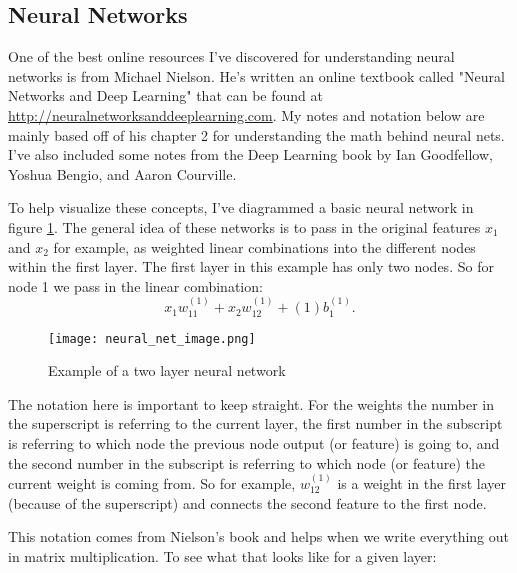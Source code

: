 \subsection{Neural Networks}

One of the best online resources I've discovered for understanding neural networks is from Michael Nielson. He's written an online textbook called "Neural Networks and Deep Learning" that can be found at \url{http://neuralnetworksanddeeplearning.com}. My notes and notation below are mainly based off of his chapter 2 for understanding the math behind neural nets. I've also included some notes from the Deep Learning book by Ian Goodfellow, Yoshua Bengio, and Aaron Courville.
 
To help visualize these concepts, I've diagrammed a basic neural network in figure \ref{fig:neural_net_image}. The general idea of these networks is to pass in the original features $x_1$ and $x_2$ for example, as weighted linear combinations into the different nodes within the first layer. The first layer in this example has only two nodes. So for node 1 we pass in the linear combination:
\begin{equation}
x_1w^{(1)}_{11} + x_2w^{(1)}_{12}  + (1)b^{(1)}_1.
\end{equation}
 
\begin{figure} \label{fig:neural_net_image}
\caption{Example of a two layer neural network}
\centering
 \texttt{[image: neural\_net\_image.png]}
 \end{figure}
 
The notation here is important to keep straight. For the weights the number in the superscript is referring to the current layer, the first number in the subscript is referring to which node the previous node output (or feature) is going to, and the second number in the subscript is referring to which node (or feature) the current weight is coming from. So for example, $w^{(1)}_{12}$ is a weight in the first layer (because of the superscript) and connects the second feature to the first node. 

This notation comes from Nielson's book and helps when we write everything out in matrix multiplication. To see what that looks like for a given layer:

